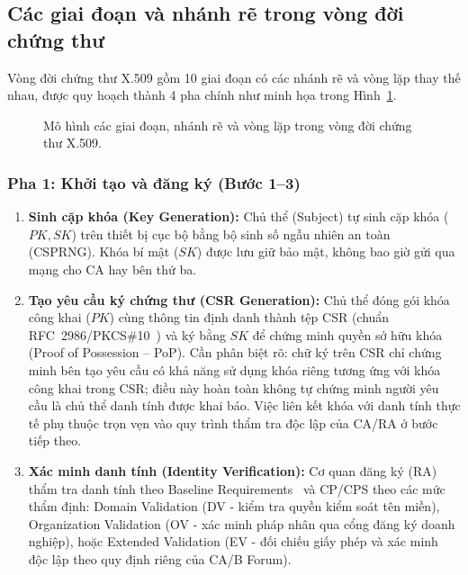 \subsection{Các giai đoạn và nhánh rẽ trong vòng đời chứng thư}
\label{subsec:lifecycle-stages}
Vòng đời chứng thư X.509 gồm 10 giai đoạn có các nhánh rẽ và vòng lặp thay thế nhau, được quy hoạch thành 4 pha chính như minh họa trong Hình~\ref{fig:certificate-lifecycle}.

\begin{figure}[!htbp]
\centering

\caption[Các giai đoạn và nhánh rẽ trong vòng đời chứng thư X.509]{Mô hình các giai đoạn, nhánh rẽ và vòng lặp trong vòng đời chứng thư X.509.}
\label{fig:certificate-lifecycle}
\end{figure}

\subsubsection*{Pha 1: Khởi tạo và đăng ký (Bước 1--3)}
\begin{enumerate}
    \item \textbf{Sinh cặp khóa (Key Generation):} Chủ thể (Subject) tự sinh cặp khóa ($PK, SK$) trên thiết bị cục bộ bằng bộ sinh số ngẫu nhiên an toàn (CSPRNG). Khóa bí mật ($SK$) được lưu giữ bảo mật, không bao giờ gửi qua mạng cho CA hay bên thứ ba.
    \item \textbf{Tạo yêu cầu ký chứng thư (CSR Generation):} Chủ thể đóng gói khóa công khai ($PK$) cùng thông tin định danh thành tệp CSR (chuẩn RFC~2986/PKCS\#10~\cite{rfc2986}) và ký bằng $SK$ để chứng minh quyền sở hữu khóa (Proof of Possession -- PoP). Cần phân biệt rõ: chữ ký trên CSR chỉ chứng minh bên tạo yêu cầu có khả năng sử dụng khóa riêng tương ứng với khóa công khai trong CSR; điều này hoàn toàn không tự chứng minh người yêu cầu là chủ thể danh tính được khai báo. Việc liên kết khóa với danh tính thực tế phụ thuộc trọn vẹn vào quy trình thẩm tra độc lập của CA/RA ở bước tiếp theo.
    \item \textbf{Xác minh danh tính (Identity Verification):} Cơ quan đăng ký (RA) thẩm tra danh tính theo Baseline Requirements~\cite{cabforum_br} và CP/CPS theo các mức thẩm định: Domain Validation (DV - kiểm tra quyền kiểm soát tên miền), Organization Validation (OV - xác minh pháp nhân qua cổng đăng ký doanh nghiệp), hoặc Extended Validation (EV - đối chiếu giấy phép và xác minh độc lập theo quy định riêng của CA/B Forum).
\end{enumerate}

